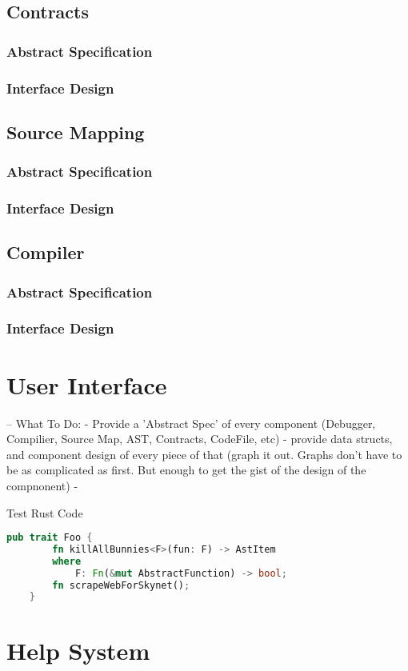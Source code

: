 \documentclass{report}
\begin{document}
\subsection{Contracts}
    \subsubsection{Abstract Specification}
    \subsubsection{Interface Design}

\subsection{Source Mapping}
    \subsubsection{Abstract Specification}
    \subsubsection{Interface Design}

\subsection{Compiler}
    \subsubsection{Abstract Specification}
    \subsubsection{Interface Design}

\section{User Interface}

-- What To Do:
    - Provide a 'Abstract Spec' of every component (Debugger, Compilier, Source Map, AST, Contracts, CodeFile, etc)
        - provide data structs, and component design of every piece of that (graph it out. Graphs don't have to be as complicated as first. But enough to get the gist of the design of the compnonent)
        -

Test Rust Code
\begin{lstlisting}[language=Rust]
    pub trait Foo {
        fn killAllBunnies<F>(fun: F) -> AstItem
        where
            F: Fn(&mut AbstractFunction) -> bool;
        fn scrapeWebForSkynet();
    }
\end{lstlisting}
\section{Help System}

\section{}
\end{document}
